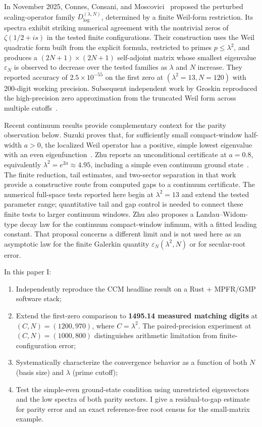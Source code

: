 \documentclass[11pt,a4paper]{article}
\begin{document}
In November 2025, Connes, Consani, and Moscovici~\cite{CCM2025}
proposed the perturbed scaling-operator family
$D_{\log}^{(\lambda, N)}$, determined by a finite Weil-form restriction.
Its spectra exhibit striking
numerical agreement with the nontrivial zeros of $\zeta(1/2 + is)$ in the tested finite configurations.
Their construction uses the Weil quadratic
form built from the explicit formula, restricted to primes
$p \leq \lambda^2$, and produces a $(2N{+}1) \times (2N{+}1)$
self-adjoint matrix whose smallest eigenvalue $\varepsilon_N$
is observed to decrease over the tested families as $\lambda$ and $N$ increase. They reported
accuracy of $2.5 \times 10^{-55}$ on the first zero at
$(\lambda^2{=}13, N{=}120)$ with 200-digit working precision.
Subsequent independent work by Groskin reproduced the high-precision
zero approximation from the truncated Weil form across multiple
cutoffs~\cite{Groskin2026HighPrecision}.

Recent continuum results provide complementary context for the parity
observation below. Suzuki proves that, for sufficiently small compact-window
half-width $a>0$, the localized Weil operator has a positive, simple lowest
eigenvalue with an even eigenfunction~\cite{Suzuki2026WeilScrew}. Zhu reports
an unconditional certificate at $a=0.8$, equivalently
$\lambda^2=e^{2a}\approx4.95$, including a simple even continuum ground
state~\cite{Zhu2026CompactWeil}. The finite reduction, tail estimates,
and two-sector separation in that work provide a constructive route
from computed gaps to a continuum certificate. The numerical full-space
tests reported here begin at $\lambda^2=13$ and extend the tested
parameter range; quantitative tail and gap control is needed to connect
these finite tests to larger continuum windows. Zhu also
proposes a Landau--Widom-type decay law for the continuum compact-window
infimum, with a fitted leading constant. That proposal concerns a different
limit and is not used here as an asymptotic law for the finite Galerkin
quantity $\varepsilon_N(\lambda^2,N)$ or for secular-root error.

In this paper I:
\begin{enumerate}
\item Independently reproduce the CCM headline result on a
Rust + MPFR/GMP software stack;
\item Extend the first-zero comparison to
\textbf{1495.14 measured matching digits} at
$(C,N)=(1200,970)$, where $C=\lambda^2$. The paired-precision
experiment at $(C,N)=(1000,800)$ distinguishes arithmetic limitation
from finite-configuration error;
\item Systematically characterize the convergence behavior as a
function of both $N$ (basis size) and $\lambda$ (prime cutoff);
\item Test the simple-even ground-state condition using unrestricted
eigenvectors and the low spectra of both parity sectors. I give a
residual-to-gap estimate for parity error and an exact reference-free
root census for the small-matrix example.
\end{enumerate}
\end{document}
